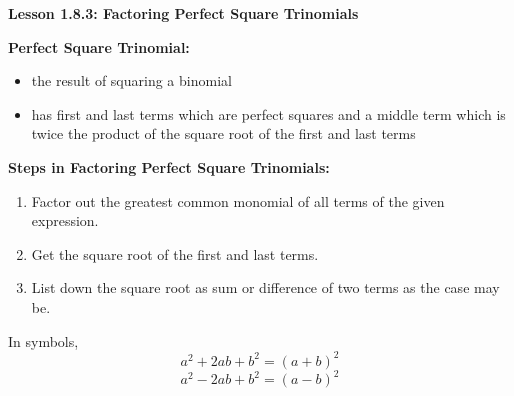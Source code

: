 \begin{center}
\textbf{Lesson 1.8.3: Factoring Perfect Square Trinomials}
\end{center}

\vspace*{-0.5ex}

\textbf{Perfect Square Trinomial:} 
\begin{itemize}
\item the result of squaring a binomial
\item has first and last terms which are perfect squares and a middle term which is twice the product of the square root of the first and last terms
\end{itemize}
 
\textbf{Steps in Factoring Perfect Square Trinomials:}

\begin{enumerate}
    		\item Factor out the greatest common monomial of all terms of the given expression.
\item Get the square root of the first and last terms. 
\item List down the square root as sum or difference of two terms as the case may be.
\end{enumerate}

In symbols, 
\vspace*{-1em} 
$$\displaystyle a^{2} + 2ab + b^{2} = (a + b)^{2}$$
$$\displaystyle a^{2} - 2ab + b^{2} = (a - b)^{2}$$
